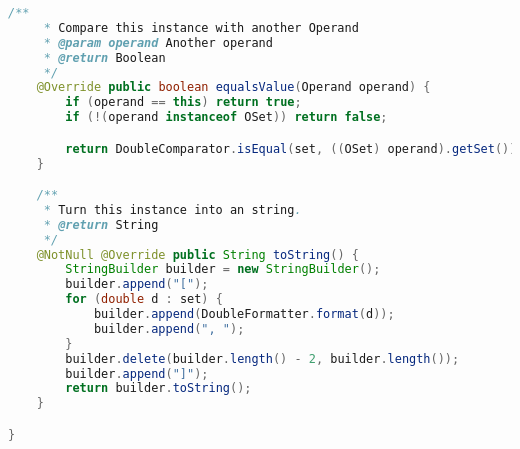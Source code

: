 \begin{lstlisting}[caption=OSet (Schwenke),label=list:OSet,language=Java]
    /**
     * Compare this instance with another Operand
     * @param operand Another operand
     * @return Boolean
     */
    @Override public boolean equalsValue(Operand operand) {
        if (operand == this) return true;
        if (!(operand instanceof OSet)) return false;

        return DoubleComparator.isEqual(set, ((OSet) operand).getSet());
    }

    /**
     * Turn this instance into an string.
     * @return String
     */
    @NotNull @Override public String toString() {
        StringBuilder builder = new StringBuilder();
        builder.append("[");
        for (double d : set) {
            builder.append(DoubleFormatter.format(d));
            builder.append(", ");
        }
        builder.delete(builder.length() - 2, builder.length());
        builder.append("]");
        return builder.toString();
    }

}
\end{lstlisting}    

